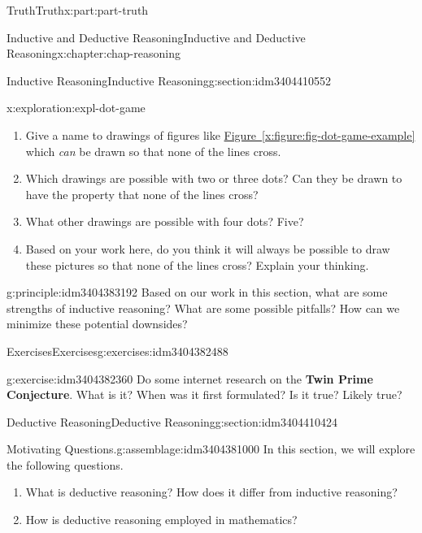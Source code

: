 \documentclass[oneside,10pt,]{book}
\newcommand{\xreffont}{\relax}
\newcommand{\terminology}[1]{\textbf{#1}}
\numberwithin{equation}{section}
\begin{document}
\begin{partptx}{Truth}{}{Truth}{}{}{x:part:part-truth}
\begin{chapterptx}{Inductive and Deductive Reasoning}{}{Inductive and Deductive Reasoning}{}{}{x:chapter:chap-reasoning}
\begin{sectionptx}{Inductive Reasoning}{}{Inductive Reasoning}{}{}{g:section:idm3404410552}
\begin{exploration}{}{x:exploration:expl-dot-game}
\begin{enumerate}
\item{}Give a name to drawings of figures like \hyperref[x:figure:fig-dot-game-example]{Figure~{\xreffont\ref{x:figure:fig-dot-game-example}}} which \emph{can} be drawn so that none of the lines cross.%
\item{}Which drawings are possible with two or three dots? Can they be drawn to have the property that none of the lines cross?%
\item{}What other drawings are possible with four dots? Five?%
\item{}Based on your work here, do you think it will always be possible to draw these pictures so that none of the lines cross? Explain your thinking.%
\end{enumerate}
\end{exploration}%
\begin{principle}{}{}{g:principle:idm3404383192}%
Based on our work in this section, what are some strengths of inductive reasoning? What are some possible pitfalls? How can we minimize these potential downsides?%
\end{principle}
%
%
\typeout{************************************************}
\typeout{************************************************}
%
\begin{exercises-subsection-numberless}{Exercises}{}{Exercises}{}{}{g:exercises:idm3404382488}
\begin{divisionexercise}{1}{}{}{g:exercise:idm3404382360}%
Do some internet research on the \terminology{Twin Prime Conjecture}. What is it? When was it first formulated? Is it true? Likely true?%
\end{divisionexercise}%
\end{exercises-subsection-numberless}
\end{sectionptx}
%
%
\typeout{************************************************}
\typeout{************************************************}
%
\begin{sectionptx}{Deductive Reasoning}{}{Deductive Reasoning}{}{}{g:section:idm3404410424}
\begin{assemblage}{Motivating Questions.}{g:assemblage:idm3404381000}%
In this section, we will explore the following questions. %
\begin{enumerate}
\item{}What is deductive reasoning? How does it differ from inductive reasoning?%
\item{}How is deductive reasoning employed in mathematics?%

\end{enumerate}
\end{assemblage}
\end{sectionptx}
\end{chapterptx}
\end{partptx}
\end{document}
